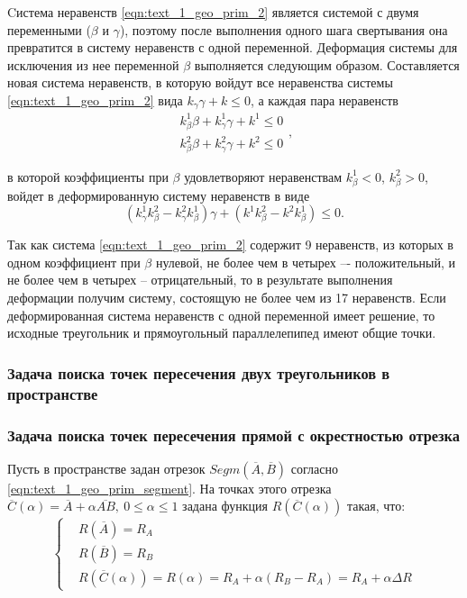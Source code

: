 Cистема неравенств \eqref{eqn:text_1_geo_prim_2} является системой с двумя переменными ($\beta$ и $\gamma$), поэтому после выполнения одного шага свертывания она превратится в систему неравенств с одной переменной.
Деформация системы для исключения из нее переменной $\beta$ выполняется следующим образом.
Составляется новая система неравенств, в которую войдут все неравенства системы \eqref{eqn:text_1_geo_prim_2} вида $k_{\gamma} \gamma + k \le 0$, а каждая пара неравенств
\begin{equation}
	\begin{aligned}
		k_{\beta}^1 \beta + k_{\gamma}^1 \gamma + k^1 \le 0 \\
		k_{\beta}^2 \beta + k_{\gamma}^2 \gamma + k^2 \le 0
	\end{aligned},
\end{equation}

в которой коэффициенты при $\beta$ удовлетворяют неравенствам $k_{\beta}^1 < 0$, $k_{\beta}^2 > 0$, войдет в деформированную систему неравенств в виде
\begin{equation}
	(k_{\gamma}^1 k_{\beta}^2 - k_{\gamma}^2 k_{\beta}^1) \gamma + (k^1 k_{\beta}^2 - k^2 k_{\beta}^1) \le 0. 
\end{equation}

Так как система \eqref{eqn:text_1_geo_prim_2} содержит 9 неравенств, из которых в одном коэффициент при $\beta$ нулевой, не более чем в четырех –- положительный, и не более чем в четырех -- отрицательный, то в результате выполнения деформации получим систему, состоящую не более чем из 17 неравенств.
Если деформированная система неравенств с одной переменной имеет решение, то исходные треугольник и прямоугольный параллелепипед имеют общие точки.

\subsubsection{Задача поиска точек пересечения двух треугольников в пространстве}

\subsubsection{Задача поиска точек пересечения прямой с окрестностью отрезка}

Пусть в пространстве задан отрезок $Segm(\overline{A}, \overline{B})$ согласно \eqref{eqn:text_1_geo_prim_segment}.
На точках этого отрезка $\overline{C}(\alpha) = \overline{A} + \alpha \overline{AB}, \ 0 \le \alpha \le 1$ задана функция $R(\overline{C}(\alpha))$ такая, что:
\begin{equation}
	\left\{
		\begin{aligned}
			& R(\overline{A}) = R_A \\
			& R(\overline{B}) = R_B \\
			& R(\overline{C}(\alpha)) = R(\alpha) = R_A + \alpha (R_B - R_A) = R_A + \alpha \Delta R
		\end{aligned}
	\right.
\end{equation}

